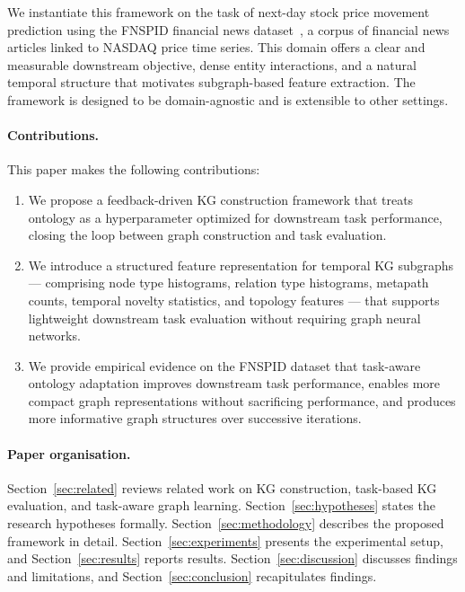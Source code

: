 We instantiate this framework on the task of next-day stock price movement prediction
using the FNSPID financial news dataset~\cite{dong2024fnspid}, a corpus of financial
news articles linked to NASDAQ price time series. This domain offers a clear and
measurable downstream objective, dense entity interactions, and a natural temporal
structure that motivates subgraph-based feature extraction. The framework is
designed to be domain-agnostic and is extensible to other settings.

\paragraph{Contributions.} This paper makes the following contributions:
\begin{enumerate}
    \item We propose a feedback-driven KG construction framework that treats ontology
    as a hyperparameter optimized for downstream task performance, closing the loop
    between graph construction and task evaluation.

    \item We introduce a structured feature representation for temporal KG subgraphs
    --- comprising node type histograms, relation type histograms, metapath counts,
    temporal novelty statistics, and topology features --- that supports lightweight
    downstream task evaluation without requiring graph neural networks.

    \item We provide empirical evidence on the FNSPID dataset that task-aware ontology
    adaptation improves downstream task performance, enables more compact graph representations
    without sacrificing performance, and produces more informative graph structures
    over successive iterations.
\end{enumerate}

\paragraph{Paper organisation.} Section~\ref{sec:related} reviews related work on KG
construction, task-based KG evaluation, and task-aware graph learning.
Section~\ref{sec:hypotheses} states the research hypotheses formally.
Section~\ref{sec:methodology} describes the proposed framework in detail.
Section~\ref{sec:experiments} presents the experimental setup, and
Section~\ref{sec:results} reports results. Section~\ref{sec:discussion} discusses
findings and limitations, and Section~\ref{sec:conclusion} recapitulates findings.
